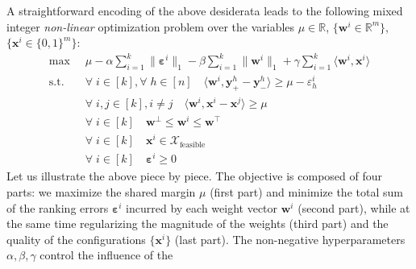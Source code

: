 \documentclass{article}
\renewcommand\[{\begin{equation}}
\renewcommand\]{\end{equation}}
\newcommand{\bbR}{\mathbb{R}}
\newcommand{\calvar}[1]{\ensuremath{\mathcal{#1}}}
\newcommand{\calX}{\calvar{X}}
\newcommand{\vecvar}[1]{\ensuremath{\boldsymbol{#1}}}
\newcommand{\vw}{\vecvar{w}}
\newcommand{\vx}{\vecvar{x}}
\newcommand{\vy}{\vecvar{y}}
\newcommand{\veps}{\vecvar{\varepsilon}}
\DeclareMathOperator*{\argmax}{argmax}
\begin{document}

A straightforward encoding of the above desiderata leads to the
following mixed integer {\em non-linear} optimization problem over the
variables $\mu \in \bbR$, $\{ \vw^i \in \bbR^m \}$, $\{ \vx^i \in \{0,1\}^m \}$:
%
{\footnotesize
\begin{align}
    \max
        & \;\; \mu - \alpha \sum_{i=1}^k \| \veps^{i} \|_1 - \beta \sum_{i=1}^k \| \vw^{i} \|_1 + \gamma \sum_{i=1}^k \langle \vw^{i}, \vx^{i} \rangle
        \nonumber
    \\
    \text{s.t.}
        & \;\; \forall \; i \in [k], \forall \; h \in [n] \quad \langle \vw^{i}, \vy^{h}_+ - \vy^{h}_- \rangle \ge \mu - \varepsilon^{i}_h \label{eq:wyconstr}
    \\
        & \;\; \forall \; i, j \in [k], i \neq j \quad \langle \vw^{i}, \vx^{i} - \vx^{j} \rangle \ge \mu \label{eq:wxconstr}
    \\
        & \;\; \forall \; i \in [k] \quad \vw^\bot \le \vw^{i} \le \vw^\top \label{eq:wbounds}
    \\
        & \;\; \forall \; i \in [k] \quad \vx^{i} \in \calX_{\text{feasible}} \label{eq:xbounds}
    \\
        & \;\; \forall \; i \in [k] \quad \veps^{i} \ge 0 \nonumber
\end{align}
}
%
Let us illustrate the above piece by piece. The objective is composed
of four parts: we maximize the shared margin $\mu$ (first part) and
minimize the total sum of the ranking errors $\veps^i$ incurred by
each weight vector $\vw^{i}$ (second part), while at the same time
regularizing the magnitude of the weights (third part) and the quality
of the configurations $\{ \vx^{i} \}$ (last part). The non-negative
hyperparameters $\alpha,\beta,\gamma$ control the influence of the
\end{document}
